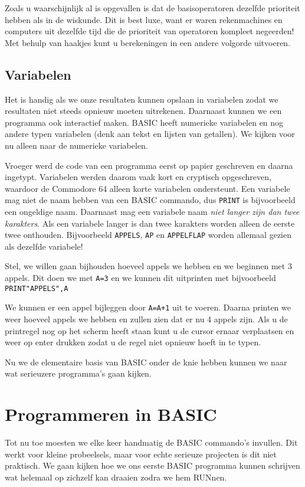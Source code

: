 \documentclass{article}
\begin{document}
Zoals u waarschijnlijk al is opgevallen is dat de basisoperatoren dezelfde prioriteit hebben als in de wiskunde.
Dit is best luxe, want er waren rekenmachines en computers uit dezelfde tijd die de prioriteit van operatoren kompleet negeerden!
Met behulp van haakjes kunt u berekeningen in een andere volgorde uitvoeren.

\subsection{Variabelen}

Het is handig als we onze resultaten kunnen opslaan in variabelen zodat we resultaten niet steeds opnieuw moeten uitrekenen.
Daarnaast kunnen we een programma ook interactief maken.
BASIC heeft numerieke variabelen en nog andere typen variabelen (denk aan tekst en lijsten van getallen).
We kijken voor nu alleen naar de numerieke variabelen.

Vroeger werd de code van een programma eerst op papier geschreven en daarna ingetypt.
Variabelen werden daarom vaak kort en cryptisch opgeschreven, waardoor de Commodore 64 alleen korte variabelen ondersteunt.
Een variabele mag niet de naam hebben van een BASIC commando, dus \verb:PRINT: is bijvoorbeeld een ongeldige naam.
Daarnaast mag een variabele naam \emph{niet langer zijn dan twee karakters}.
Als een variabele langer is dan twee karakters worden alleen de eerste twee onthouden.
Bijvoorbeeld \verb:APPELS:, \verb:AP: en \verb:APPELFLAP: worden allemaal gezien als dezelfde variabele!

Stel, we willen gaan bijhouden hoeveel appels we hebben en we beginnen met 3 appels.
Dit doen we met \verb:A=3: en we kunnen dit uitprinten met bijvoorbeeld \verb:PRINT"APPELS",A:

We kunnen er een appel bijleggen door \verb:A=A+1: uit te voeren.
Daarna printen we weer hoeveel appels we hebben en zullen zien dat er nu 4 appels zijn.
Als u de printregel nog op het scherm heeft staan kunt u de cursor ernaar verplaatsen en weer op enter drukken zodat u de regel niet opnieuw hoeft in te typen.

Nu we de elementaire basis van BASIC onder de knie hebben kunnen we naar wat serieuzere programma's gaan kijken.

\section{Programmeren in BASIC}

Tot nu toe moesten we elke keer handmatig de BASIC commando's invullen.
Dit werkt voor kleine probeelsels, maar voor echte serieuze projecten is dit niet praktisch.
We gaan kijken hoe we ons eerste BASIC programma kunnen schrijven wat helemaal op zichzelf kan draaien zodra we hem RUNnen.
\end{document}
